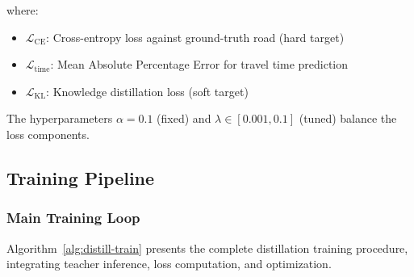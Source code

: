 where:
\begin{itemize}[noitemsep,topsep=0pt]
\item $\mathcal{L}_{\text{CE}}$: Cross-entropy loss against ground-truth road (hard target)
\item $\mathcal{L}_{\text{time}}$: Mean Absolute Percentage Error for travel time prediction
\item $\mathcal{L}_{\text{KL}}$: Knowledge distillation loss (soft target)
\end{itemize}

The hyperparameters $\alpha = 0.1$ (fixed) and $\lambda \in [0.001, 0.1]$ (tuned) balance the loss components.

\subsection{Training Pipeline}
\label{sec:method-training}

\subsubsection{Main Training Loop}
Algorithm~\ref{alg:distill-train} presents the complete distillation training procedure, integrating teacher inference, loss computation, and optimization.

